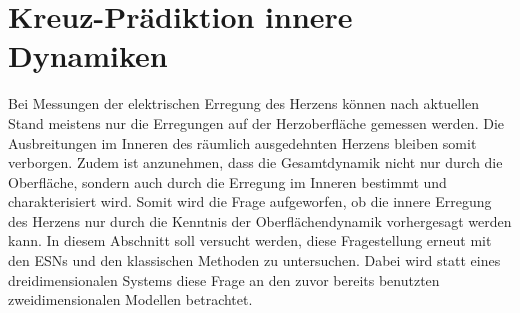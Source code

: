 \section{Kreuz-Prädiktion innere Dynamiken}
Bei Messungen der elektrischen Erregung des Herzens können nach aktuellen Stand meistens nur die Erregungen auf der Herzoberfläche gemessen werden. Die Ausbreitungen im Inneren des räumlich ausgedehnten Herzens bleiben somit verborgen. Zudem ist anzunehmen, dass die Gesamtdynamik nicht nur durch die Oberfläche, sondern auch durch die Erregung im Inneren bestimmt und charakterisiert wird. Somit wird die Frage aufgeworfen, ob die innere Erregung des Herzens nur durch die Kenntnis der Oberflächendynamik vorhergesagt werden kann. In diesem Abschnitt soll versucht werden, diese Fragestellung erneut mit den \textsc{ESN}s und den klassischen Methoden zu untersuchen. Dabei wird statt eines dreidimensionalen Systems diese Frage an den zuvor bereits benutzten zweidimensionalen Modellen betrachtet.\\